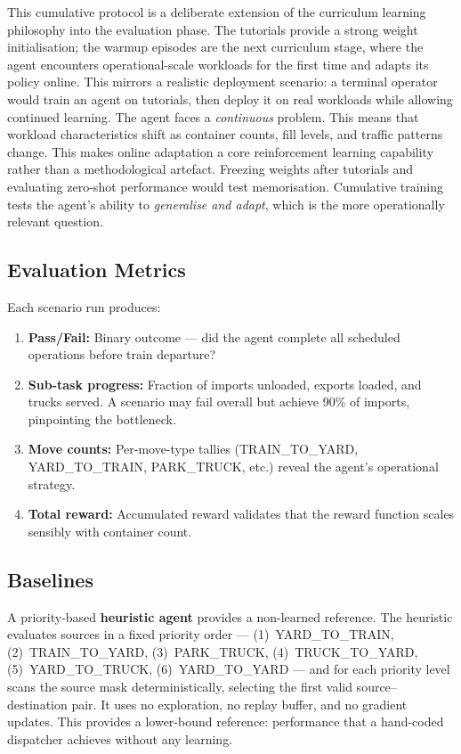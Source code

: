 This cumulative protocol is a deliberate extension of the curriculum learning philosophy into the evaluation phase.  The tutorials provide a strong weight initialisation; the warmup episodes are the next curriculum stage, where the agent encounters operational-scale workloads for the first time and adapts its policy online.  This mirrors a realistic deployment scenario: a terminal operator would train an agent on tutorials, then deploy it on real workloads while allowing continued learning.  The agent faces a \emph{continuous} problem. This means that workload characteristics shift as container counts, fill levels, and traffic patterns change. This makes online adaptation a core reinforcement learning capability rather than a methodological artefact.  Freezing weights after tutorials and evaluating zero-shot performance would test memorisation. Cumulative training tests the agent's ability to \emph{generalise and adapt}, which is the more operationally relevant question.

\subsection{Evaluation Metrics}
\label{sec:exp:phase2:metrics}

Each scenario run produces:

\begin{enumerate}
  \small  
  \item \textbf{Pass/Fail:} Binary outcome --- did the agent complete all scheduled operations before train departure?
  \item \textbf{Sub-task progress:} Fraction of imports unloaded, exports loaded, and trucks served. A scenario may fail overall but achieve 90\% of imports, pinpointing the bottleneck.
  \item \textbf{Move counts:} Per-move-type tallies (TRAIN\_TO\_YARD, YARD\_TO\_TRAIN, PARK\_TRUCK, etc.) reveal the agent's operational strategy.
  \item \textbf{Total reward:} Accumulated reward validates that the reward function scales sensibly with container count.
\end{enumerate}

\subsection{Baselines}
\label{sec:exp:phase2:baselines}

A priority-based \textbf{heuristic agent} provides a non-learned reference.  The heuristic evaluates sources in a fixed priority order --- (1)~YARD\_TO\_TRAIN, (2)~TRAIN\_TO\_YARD, (3)~PARK\_TRUCK, (4)~TRUCK\_TO\_YARD, (5)~YARD\_TO\_TRUCK, (6)~YARD\_TO\_YARD --- and for each priority level scans the source mask deterministically, selecting the first valid source--destination pair.  It uses no exploration, no replay buffer, and no gradient updates.  This provides a lower-bound reference: performance that a hand-coded dispatcher achieves without any learning.

